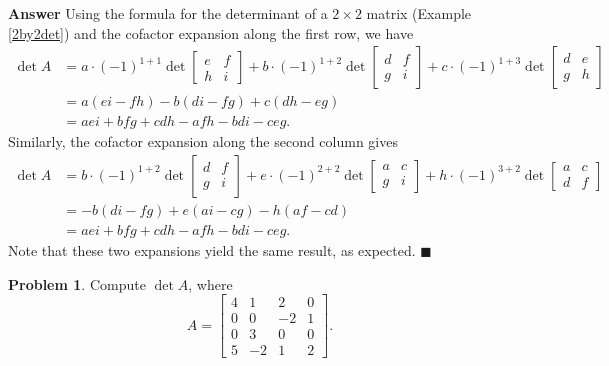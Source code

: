 \documentclass[12pt,letterpaper]{book}
\numberwithin{equation}{section}
\theoremstyle{definition}
\newtheorem{problem}[thm]{\textbf{Problem}}
\newenvironment{answer}{\noindent\textbf{Answer}}{\hfill$\blacksquare$\vspace{0.1in}}
\begin{document}
\begin{answer} Using the formula for the determinant of a $2\times 2$ matrix (Example \ref{2by2det}) and the cofactor expansion along the first row, we have
\begin{align*}\det A&=a\cdot(-1)^{1+1} \det\left[\begin{array}{rr} e & f \\ h & i \end{array}\right] + b\cdot(-1)^{1+2} \det\left[\begin{array}{rr} d & f \\ g & i \end{array}\right] +c\cdot(-1)^{1+3} \det\left[\begin{array}{rr} d & e \\ g & h \end{array}\right] \\
&=a(ei-fh)-b(di-fg)+c(dh-eg)\\
&=aei+bfg+cdh-afh-bdi-ceg.
\end{align*}
Similarly, the cofactor expansion along the second column gives
\begin{align*}\det A&=b\cdot(-1)^{1+2} \det\left[\begin{array}{rr} d & f \\ g & i \end{array}\right] + e\cdot(-1)^{2+2} \det\left[\begin{array}{rr} a & c \\ g & i \end{array}\right] +h\cdot(-1)^{3+2} \det\left[\begin{array}{rr} a & c \\ d & f \end{array}\right] \\
&=-b(di-fg)+e(ai-cg)-h(af-cd)\\
&=aei+bfg+cdh-afh-bdi-ceg.
\end{align*}
Note that these two expansions yield the same result, as expected.
\end{answer}

\begin{problem}
 Compute $\det A$, where
$$A=\left[\begin{array}{rrrr} 4 & 1 & 2 & 0 \\ 0 & 0 & -2 & 1 \\ 0 & 3 & 0 & 0 \\ 5 & -2 & 1 & 2 \end{array}\right].$$
\end{problem}
\end{document}
